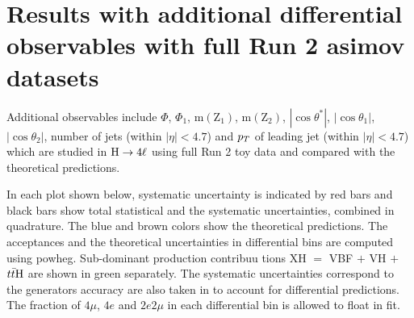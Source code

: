 \section{Results with additional differential observables with full Run 2 asimov datasets}
Additional observables include $\Phi$, $\Phi_{1}$, $\mathrm{m}(\mathrm{Z}_{1})$, $\mathrm{m}(\mathrm{Z}_{2})$, $|\cos \theta^{*}|$, $|\cos \theta_{1}|$, $|\cos \theta_{2}|$, number of jets (within $|\eta|<4.7$) and $p_T$ of leading jet (within $|\eta|<4.7$) which are studied in $\mathrm{H}\rightarrow4\ell$ using full Run 2 toy data and compared with the theoretical predictions.
\par In each plot shown below, systematic uncertainty is indicated by red bars and black bars show total statistical and the systematic uncertainties, combined in quadrature. The blue and brown colors show the theoretical predictions. 
          The acceptances and the theoretical uncertainties in differential bins are computed using {\sc powheg}. Sub-dominant production contribuu
tions XH $=$ VBF $+$ VH $+$ $t\bar{t}{\rm H}$ are shown in green separately. The systematic uncertainties correspond to the generators accuracy are also taken in to account for differential predictions. The fraction of $4\mu$, $4e$ and $2e2\mu$ in each differential bin is allowed to float in fit.
